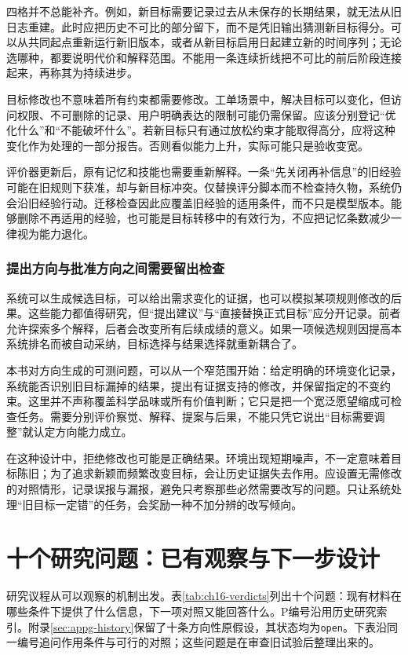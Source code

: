 四格并不总能补齐。例如，新目标需要记录过去从未保存的长期结果，就无法从旧日志重建。此时应把历史不可比的部分留下，而不是凭旧输出猜测新目标得分。可以从共同起点重新运行新旧版本，或者从新目标启用日起建立新的时间序列；无论选哪种，都要说明代价和解释范围。不能用一条连续折线把不可比的前后阶段连接起来，再称其为持续进步。

目标修改也不意味着所有约束都需要修改。工单场景中，解决目标可以变化，但访问权限、不可删除的记录、用户明确表达的限制可能仍需保留。应该分别登记“优化什么”和“不能破坏什么”。若新目标只有通过放松约束才能取得高分，应将这种变化作为处理的一部分报告。否则看似能力上升，实际可能只是验收变宽。

评价器更新后，原有记忆和技能也需要重新解释。一条“先关闭再补信息”的旧经验可能在旧规则下获准，却与新目标冲突。仅替换评分脚本而不检查持久物，系统仍会沿旧经验行动。迁移检查因此应覆盖旧经验的适用条件，而不只是模型版本。能够删除不再适用的经验，也可能是目标转移中的有效行为，不应把记忆条数减少一律视为能力退化。

\subsubsection{提出方向与批准方向之间需要留出检查}

系统可以生成候选目标，可以给出需求变化的证据，也可以模拟某项规则修改的后果。这些能力都值得研究，但“提出建议”与“直接替换正式目标”应分开记录。前者允许探索多个解释，后者会改变所有后续成绩的意义。如果一项候选规则因提高本系统排名而被自动采纳，目标选择与结果选择就重新耦合了。

本书对方向生成的可测问题，可以从一个窄范围开始：给定明确的环境变化记录，系统能否识别旧目标漏掉的结果，提出有证据支持的修改，并保留指定的不变约束。这里并不声称覆盖科学品味或所有价值判断；它只是把一个宽泛愿望缩成可检查任务。需要分别评价察觉、解释、提案与后果，不能只凭它说出“目标需要调整”就认定方向能力成立。

在这种设计中，拒绝修改也可能是正确结果。环境出现短期噪声，不一定意味着目标陈旧；为了追求新颖而频繁改变目标，会让历史证据失去作用。应设置无需修改的对照情形，记录误报与漏报，避免只考察那些必然需要改写的问题。只让系统处理“旧目标一定错”的任务，会奖励一种不加分辨的改写倾向。

\section{十个研究问题：已有观察与下一步设计}
\label{sec:ch16-verdicts}

研究议程从可以观察的机制出发。表\ref{tab:ch16-verdicts}列出十个问题：现有材料在哪些条件下提供了什么信息，下一项对照又能回答什么。P编号沿用历史研究索引。附录\ref{sec:appg-history}保留了十条方向性原假设，其状态均为\texttt{open}。下表沿同一编号追问作用条件与可行的对照；这些问题是在审查旧试验后整理出来的。

